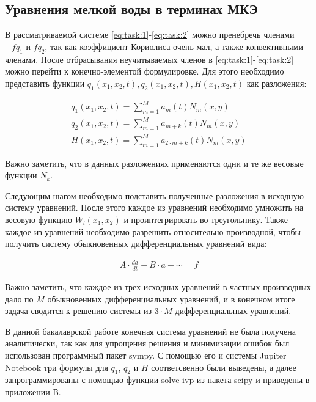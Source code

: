 \documentclass[14pt]{extreport}
\begin{document}
\subsection{Уравнения мелкой воды в терминах МКЭ}

В рассматриваемой системе \ref{eq:task:1}-\ref{eq:task:2} можно пренебречь членами $-fq_{1}$ и $fq_2$, так как коэффициент Кориолиса очень мал, а также конвективными членами. После отбрасывания неучитываемых членов в \ref{eq:task:1}-\ref{eq:task:2} можно перейти к конечно-элементой формулировке. Для этого необходимо представить функции $q_1(x_1, x_2,t) , q_2(x_1, x_2,t), H(x_1, x_2,t)$ как разложения:

\begin{eqnarray}\label{eq:fem:approx}
q_1(x_1, x_2, t) = \sum\limits_{m=1}^{M} a_m(t)N_m(x, y) \\
q_2(x_1, x_2, t) = \sum\limits_{m=1}^{M} a_{m+k}(t)N_m(x, y) \\
H(x_1, x_2, t) = \sum\limits_{m=1}^{M} a_{2\cdot m+k}(t)N_m(x, y)
\end{eqnarray}

Важно заметить, что в данных разложениях применяются одни и те же весовые функции $N_k$.

Следующим шагом необходимо подставить полученные разложения в исходную систему уравнений. После этого каждое из уравнений необходимо умножить на весовую функцию $W_l(x_1, x_2)$ и проинтегрировать во треугольнику. Также каждое из уравнений необходимо разрешить относительно производной, чтобы получить систему обыкновенных дифференциальных уравнений\cite{bib:calc:gurevich:2004} вида:

\begin{eqnarray}
A \cdot \frac{da}{dt} + B \cdot a + \cdots = f
\end{eqnarray}

Важно заметить, что каждое из трех исходных уравнений в частных производных дало по $M$ обыкновенных дифференциальных уравнений, и в конечном итоге задача сводится к решению системы из $3\cdot M$ дифференциальных уравнений.

В данной бакалаврской работе конечная система уравнений не была получена аналитически, так как для упрощения решения и минимизации ошибок был использован программный пакет sympy\cite{bib:python:mastering:2015}. С помощью его и системы Jupiter Notebook три формулы для $q_1$, $q_2$ и $H$ соответсвенно  были выведены, а далее запрограммированы с помощью функции solve ivp из пакета scipy и приведены в приложении В.
\end{document}
